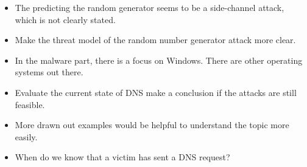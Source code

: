 \documentclass[peerreview, 10pt, onecolumn]{IEEEtran}
\begin{document}
\begin{itemize}
        \item The predicting the random generator seems to be a side-channel attack, which is not clearly stated.
        \item Make the threat model of the random number generator attack more clear.
        \item In the malware part, there is a focus on Windows. There are other operating systems out there.
        \item Evaluate the current state of DNS make a conclusion if the attacks are still feasible.
        \item More drawn out examples would be helpful to understand the topic more easily. 
        \item When do we know that a victim has sent a DNS request?
    \end{itemize}
\end{document}
